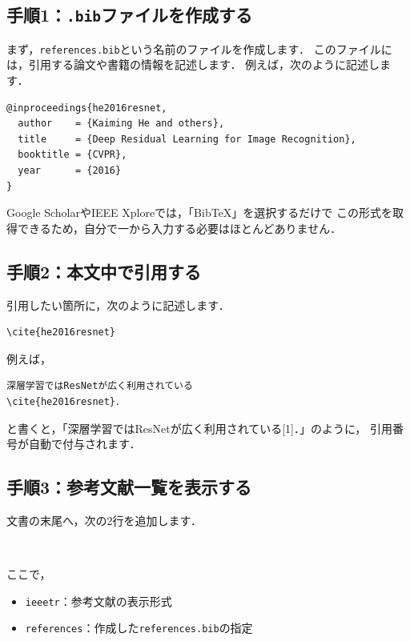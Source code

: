 \documentclass[a4paper,twocolumn]{jsarticle}
\begin{document}
\subsection*{手順1：\texttt{.bib}ファイルを作成する}
まず，\texttt{references.bib}という名前のファイルを作成します．
このファイルには，引用する論文や書籍の情報を記述します．
例えば，次のように記述します．

\begin{lstlisting}[language={}]
@inproceedings{he2016resnet,
  author    = {Kaiming He and others},
  title     = {Deep Residual Learning for Image Recognition},
  booktitle = {CVPR},
  year      = {2016}
}
\end{lstlisting}

Google ScholarやIEEE Xploreでは，「BibTeX」を選択するだけで
この形式を取得できるため，自分で一から入力する必要はほとんどありません．

\subsection*{手順2：本文中で引用する}
引用したい箇所に，次のように記述します．

\begin{verbatim}
\cite{he2016resnet}
\end{verbatim}

例えば，

\begin{verbatim}
深層学習ではResNetが広く利用されている
\cite{he2016resnet}．
\end{verbatim}

と書くと，「深層学習ではResNetが広く利用されている[1]．」のように，
引用番号が自動で付与されます．

\subsection*{手順3：参考文献一覧を表示する}
文書の末尾へ，次の2行を追加します．

\begin{verbatim}


\end{verbatim}

ここで，

\begin{itemize}
    \item \texttt{ieeetr}：参考文献の表示形式
    \item \texttt{references}：作成した\texttt{references.bib}の指定
\end{itemize}
\end{document}

